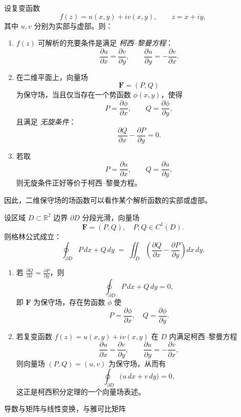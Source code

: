 \documentclass[lang=cn,10pt]{elegantbook}
\begin{document}
\begin{proposition}[二维保守场与解析函数的联系]
设复变函数
\[
f(z) = u(x,y) + i v(x,y), \qquad z = x + i y,
\]
其中 $u,v$ 分别为实部与虚部。则：

\begin{enumerate}
    \item $f(z)$ 可解析的充要条件是满足 \emph{柯西–黎曼方程}：
    \[
    \frac{\partial u}{\partial x} = \frac{\partial v}{\partial y}, 
    \qquad
    \frac{\partial u}{\partial y} = - \frac{\partial v}{\partial x}.
    \]

    \item 在二维平面上，向量场
    \[
    \mathbf{F} = (P,Q)
    \]
    为保守场，当且仅当存在一个势函数 $\phi(x,y)$，使得
    \[
    P = \frac{\partial \phi}{\partial x}, 
    \qquad
    Q = \frac{\partial \phi}{\partial y},
    \]
    且满足 \emph{无旋条件}：
    \[
    \frac{\partial Q}{\partial x} - \frac{\partial P}{\partial y} = 0.
    \]

    \item 若取
    \[
    P = \frac{\partial u}{\partial x}, 
    \qquad
    Q = \frac{\partial u}{\partial y},
    \]
    则无旋条件正好等价于柯西–黎曼方程。
\end{enumerate}

因此，二维保守场的场函数可以看作某个解析函数的实部或虚部。
\end{proposition}
\begin{proposition}
设区域 $D \subset \mathbb{R}^2$ 边界 $\partial D$ 分段光滑，向量场 
\[
\mathbf{F}=(P,Q), \quad P,Q \in C^1(D).
\]
则格林公式成立：
\[
\oint_{\partial D} P\,dx + Q\,dy
\;=\;
\iint_{D} \left( \frac{\partial Q}{\partial x} - \frac{\partial P}{\partial y} \right) dx\,dy.
\]

\begin{enumerate}
  \item 若 $\frac{\partial Q}{\partial x} = \frac{\partial P}{\partial y}$，则
  \[
  \oint_{\partial D} P\,dx + Q\,dy = 0,
  \]
  即 $\mathbf{F}$ 为保守场，存在势函数 $\phi$ 使
  \[
  P=\frac{\partial \phi}{\partial x},\quad Q=\frac{\partial \phi}{\partial y}.
  \]

  \item 若复变函数 $f(z)=u(x,y)+iv(x,y)$ 在 $D$ 内满足柯西--黎曼方程
  \[
  \frac{\partial u}{\partial x} = \frac{\partial v}{\partial y}, 
  \qquad
  \frac{\partial u}{\partial y} = -\frac{\partial v}{\partial x},
  \]
  则向量场 $(P,Q)=(u,v)$ 为保守场，从而有
  \[
  \oint_{\partial D} \big( u\,dx + v\,dy \big) = 0,
  \]
  这正是柯西积分定理的一个向量场表述。
\end{enumerate}

导数与矩阵与线性变换，与雅可比矩阵




\end{proposition}
\end{document}
